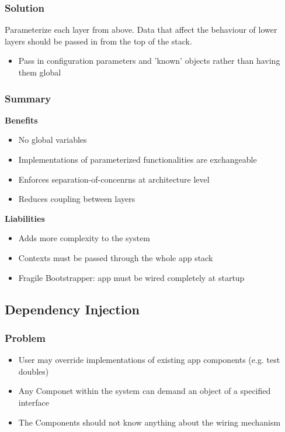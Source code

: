 \subsubsection{Solution}
Parameterize each layer from above. Data that affect the behaviour of lower layers should be passed in from the top of the stack.
\begin{itemize}
    \item Pass in configuration parameters and 'known' objects rather than having them global
\end{itemize}
\subsubsection{Summary}
\textbf{Benefits}
\begin{itemize}
    \item No global variables
    \item Implementations of parameterized functionalities are exchangeable
    \item Enforces separation-of-concenrns at architecture level
    \item Reduces coupling between layers
\end{itemize}
\textbf{Liabilities}
\begin{itemize}
    \item Adds more complexity to the system
    \item Contexts must be passed through the whole app stack
    \item Fragile Bootstrapper: app must be wired completely at startup
\end{itemize}

\subsection{Dependency Injection}
\subsubsection{Problem}
\begin{itemize}
    \item User may override implementations of existing app components (e.g. test doubles)
    \item Any Componet within the system can demand an object of a specified interface
    \item The Components should not know anything about the wiring mechanism
\end{itemize}
